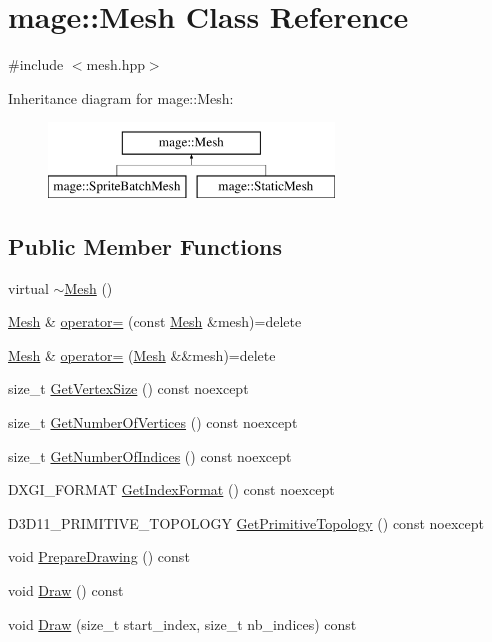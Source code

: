\hypertarget{classmage_1_1_mesh}{}\section{mage\+:\+:Mesh Class Reference}
\label{classmage_1_1_mesh}


{\ttfamily \#include $<$mesh.\+hpp$>$}

Inheritance diagram for mage\+:\+:Mesh\+:\begin{figure}[H]
\begin{center}
\leavevmode
\includegraphics[height=2.000000cm]{classmage_1_1_mesh}
\end{center}
\end{figure}
\subsection*{Public Member Functions}
\begin{DoxyCompactItemize}
\item 
virtual \hyperlink{classmage_1_1_mesh_afa39b90805e434cabb0989878e335b9e}{$\sim$\+Mesh} ()
\item 
\hyperlink{classmage_1_1_mesh}{Mesh} \& \hyperlink{classmage_1_1_mesh_a5baf961af32b379671a59a082492bc5e}{operator=} (const \hyperlink{classmage_1_1_mesh}{Mesh} \&mesh)=delete
\item 
\hyperlink{classmage_1_1_mesh}{Mesh} \& \hyperlink{classmage_1_1_mesh_a28e437196db171b2df1c4bcf3df07a63}{operator=} (\hyperlink{classmage_1_1_mesh}{Mesh} \&\&mesh)=delete
\item 
size\+\_\+t \hyperlink{classmage_1_1_mesh_a01ea4c5a09ffc6b4babc26a4f85a673e}{Get\+Vertex\+Size} () const noexcept
\item 
size\+\_\+t \hyperlink{classmage_1_1_mesh_af2787f8893895e9a8ebec70d3062288f}{Get\+Number\+Of\+Vertices} () const noexcept
\item 
size\+\_\+t \hyperlink{classmage_1_1_mesh_a27a6ec7761ebc90995186fe1da677a70}{Get\+Number\+Of\+Indices} () const noexcept
\item 
D\+X\+G\+I\+\_\+\+F\+O\+R\+M\+AT \hyperlink{classmage_1_1_mesh_ad5cda42bebb42c7ade7b3efdc788d570}{Get\+Index\+Format} () const noexcept
\item 
D3\+D11\+\_\+\+P\+R\+I\+M\+I\+T\+I\+V\+E\+\_\+\+T\+O\+P\+O\+L\+O\+GY \hyperlink{classmage_1_1_mesh_af64af13acf2f372515ffdc20ce45fcb4}{Get\+Primitive\+Topology} () const noexcept
\item 
void \hyperlink{classmage_1_1_mesh_a728979ae0be55283813eecf3e7c40e80}{Prepare\+Drawing} () const
\item 
void \hyperlink{classmage_1_1_mesh_a62f7b8176f7747f2b4db7674524a146c}{Draw} () const
\item 
void \hyperlink{classmage_1_1_mesh_ae1f71bddbb1fa3b45cec55f0fe920c7d}{Draw} (size\+\_\+t start\+\_\+index, size\+\_\+t nb\+\_\+indices) const
\end{DoxyCompactItemize}
